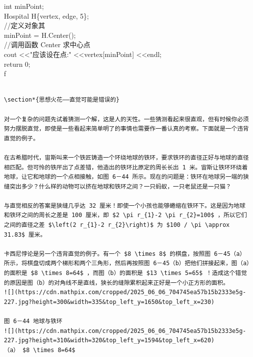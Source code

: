 \documentclass[10pt]{article}
\begin{document}
\begin{verbatim}

\end{verbatim}

int minPoint;\\
Hospital H\{vertex, edge, 5\};\\
//定义对象其\\
minPoint = H.Center();\\
//调用函数 Center 求中心点\\[0pt]
cout <<"应该设在点:" <<vertex[minPoint] <<endl;\\
return 0;\\
f

\begin{verbatim}

\section*{思想火花——直觉可能是错误的}

对一个复杂的问题先试着猜测一个解，这是人的天性。一些猜测看起来很直观，但有时候你必须努力摆脱直觉，即使是一些看起来简单明了的事情也需要作一番认真的考察。下面就是一个违背直觉的例子。

在古希腊时代，宙斯叫来一个铁匠铸造一个环绕地球的铁环，要求铁环的直径正好与地球的直径相匹配。但可怜的铁厈出了点差错，他造出的铁环比原定的周长长出 1 米。宙斯让铁环环绕着地球，让它和地球的一个点相接触，如图 6－44 所示。现在的问题是：铁环在地球另一端的狭缝突出多少？什么样的动物可以挤在地球和铁环之间？一只蚂蚁，一只老鼠还是一只猫？

与直觉相反的答案是狭缝几乎达 32 厘米！即使一个小孩也能够蜷缩在铁环下。这是因为地球和铁环之间的周长之差是 100 厘米，即 $2 \pi r_{1}-2 \pi r_{2}=100$ ，所以它们之间的直径之差 $\left(2 r_{1}-2 r_{2}\right)$ 为 $100 / \pi \approx 31.83$ 厘米。

卡西尼悖论是另一个违背直觉的例子。有一个 $8 \times 8$ 的棋盘，按照图 6－45（a）所示，将棋盘切成两个梯形和两个三角形，然后再按照图 6－45（b）把他们拼接起来，图（a）的面积是 $8 \times 8=64$ ，而图（b）的面积是 $13 \times 5=65$ ！造成这个错觉的原因是图（b）的对角线不是直线，狭长的缝隙累积起来正好是一个小正方形的面积。
![](https://cdn.mathpix.com/cropped/2025_06_06_704745ea57b15b2333e5g-227.jpg?height=300&width=335&top_left_y=1650&top_left_x=230)

图 6－44 地球与铁环
![](https://cdn.mathpix.com/cropped/2025_06_06_704745ea57b15b2333e5g-227.jpg?height=310&width=320&top_left_y=1594&top_left_x=620)
（a） $8 \times 8=64$


\end{verbatim}
\end{document}
